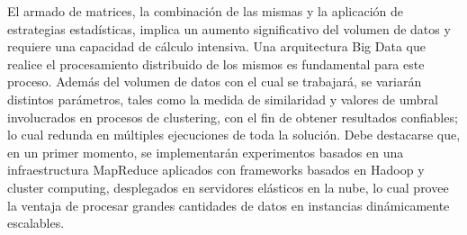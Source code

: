 \bigskip El armado de matrices, la combinación de las mismas y la aplicación de estrategias estadísticas, implica un aumento significativo del volumen de datos y requiere una capacidad de cálculo intensiva. Una arquitectura Big Data que realice el procesamiento distribuido de los mismos es fundamental para este proceso. Además del volumen de datos con el cual se trabajará, se variarán distintos parámetros, tales como la medida de similaridad y valores de umbral involucrados en procesos de clustering, con el fin de obtener resultados confiables; lo cual redunda en múltiples ejecuciones de toda la solución. Debe destacarse que, en un primer momento, se implementarán experimentos basados en una infraestructura MapReduce aplicados con frameworks basados en Hadoop y cluster computing, desplegados en servidores elásticos en la nube, lo cual provee la ventaja de procesar grandes cantidades de datos en instancias dinámicamente escalables.
